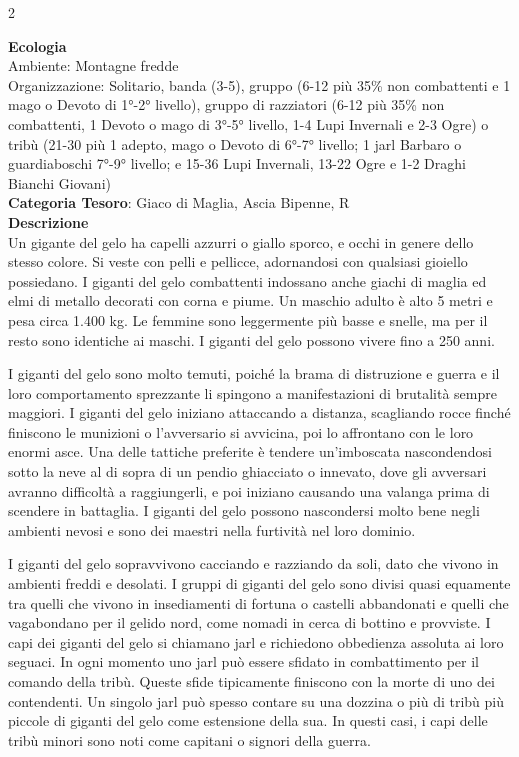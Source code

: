 \begin{multicols}{2}
{\textbf{Ecologia}\\
Ambiente: Montagne fredde\\
Organizzazione: Solitario, banda (3-5), gruppo (6-12 più 35\% non combattenti e 1 mago o Devoto di 1°-2° livello), gruppo di razziatori (6-12 più 35\% non combattenti, 1 Devoto o mago di 3°-5° livello, 1-4 Lupi Invernali e 2-3 Ogre) o tribù (21-30 più 1 adepto, mago o Devoto di 6°-7° livello; 1 jarl Barbaro o guardiaboschi 7°-9° livello; e 15-36 Lupi Invernali, 13-22 Ogre e 1-2 Draghi Bianchi Giovani)\\
\textbf{Categoria Tesoro}: Giaco di Maglia, Ascia Bipenne, R\\
\textbf{Descrizione}\\
Un gigante del gelo ha capelli azzurri o giallo sporco, e occhi in genere dello stesso colore. Si veste con pelli e pellicce, adornandosi con qualsiasi gioiello possiedano. I giganti del gelo combattenti indossano anche giachi di maglia ed elmi di metallo decorati con corna e piume. Un maschio adulto è alto 5 metri e pesa circa 1.400 kg. Le femmine sono leggermente più basse e snelle, ma per il resto sono identiche ai maschi. I giganti del gelo possono vivere fino a 250 anni.

I giganti del gelo sono molto temuti, poiché la brama di distruzione e guerra e il loro comportamento sprezzante li spingono a manifestazioni di brutalità sempre maggiori. I giganti del gelo iniziano attaccando a distanza, scagliando rocce finché finiscono le munizioni o l'avversario si avvicina, poi lo affrontano con le loro enormi asce. Una delle tattiche preferite è tendere un'imboscata nascondendosi sotto la neve al di sopra di un pendio ghiacciato o innevato, dove gli avversari avranno difficoltà a raggiungerli, e poi iniziano causando una valanga prima di scendere in battaglia. I giganti del gelo possono nascondersi molto bene negli ambienti nevosi e sono dei maestri nella furtività nel loro dominio.

I giganti del gelo sopravvivono cacciando e razziando da soli, dato che vivono in ambienti freddi e desolati. I gruppi di giganti del gelo sono divisi quasi equamente tra quelli che vivono in insediamenti di fortuna o castelli abbandonati e quelli che vagabondano per il gelido nord, come nomadi in cerca di bottino e provviste. I capi dei giganti del gelo si chiamano jarl e richiedono obbedienza assoluta ai loro seguaci. In ogni momento uno jarl può essere sfidato in combattimento per il comando della tribù. Queste sfide tipicamente finiscono con la morte di uno dei contendenti. Un singolo jarl può spesso contare su una dozzina o più di tribù più piccole di giganti del gelo come estensione della sua. In questi casi, i capi delle tribù minori sono noti come capitani o signori della guerra.

}
\end{multicols}
